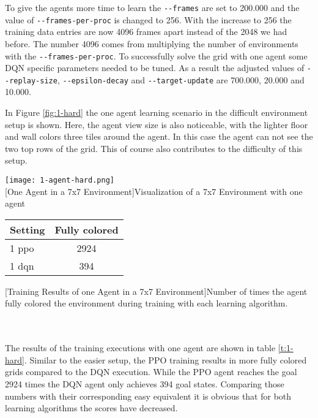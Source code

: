 To give the agents more time to learn the \verb|--frames| are set to 200.000 and the value of \verb|--frames-per-proc| is changed to 256. With the increase to 256 the training data entries are now 4096 frames apart instead of the 2048 we had before. The number 4096 comes from multiplying the number of environments with the \verb|--frames-per-proc|. To successfully solve the grid with one agent some DQN specific parameters needed to be tuned. As a result the adjusted values of \verb|--replay-size|, \verb|--epsilon-decay| and \verb|--target-update| are 700.000, 20.000 and 10.000. 

In Figure \ref{fig:1-hard} the one agent learning scenario in the difficult environment setup is shown. Here, the agent view size is also noticeable, with the lighter floor and wall colors three tiles around the agent. In this case the agent can not see the two top rows of the grid. This of course also contributes to the difficulty of this setup. \\

\begin{minipage}{\textwidth}
  \begin{minipage}[b]{0.29\textwidth}
    \centering
    \texttt{[image: 1-agent-hard.png]}\\
    [One Agent in a 7x7 Environment]{Visualization of a 7x7 Environment with one agent}\label{fig:1-hard}
  \end{minipage}
  \hfill
  \begin{minipage}[b]{0.69\textwidth}
    \centering
    \begin{tabular}{lc}\hline
      Setting & Fully colored \\ \hline
        1 ppo & 2924 \\
        1 dqn & 394 \\ \hline
      \end{tabular}
      [Training Results of one Agent in a 7x7 Environment]{Number of times the agent fully colored the environment during training with each learning algorithm.\\ }\label{t:1-hard}
    \end{minipage}
  \end{minipage}\\\\

The results of the training executions with one agent are shown in table \ref{t:1-hard}. Similar to the easier setup, the PPO training results in more fully colored grids compared to the DQN execution. While the PPO agent reaches the goal 2924 times the DQN agent only achieves 394 goal states. Comparing those numbers with their corresponding easy equivalent it is obvious that for both learning algorithms the scores have decreased.

